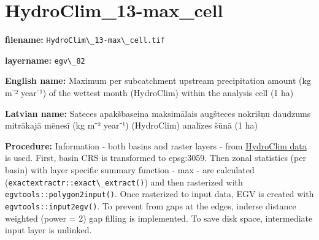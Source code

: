 \documentclass[
]{book}
\newcommand{\passthrough}[1]{#1}
\begin{document}
\section{HydroClim\_13-max\_cell}\label{ch06.082}

\textbf{filename:} \passthrough{\lstinline!HydroClim\_13-max\_cell.tif!}

\textbf{layername:} \passthrough{\lstinline!egv\_82!}

\textbf{English name:} Maximum per subcatchment upstream precipitation amount (kg m⁻² year⁻¹) of the wettest month (HydroClim) within the analysis cell (1 ha)

\textbf{Latvian name:} Sateces apakšbaseina maksimālais augšteces nokrišņu daudzums mitrākajā mēnesī (kg m⁻² year⁻¹) (HydroClim) analīzes šūnā (1 ha)

\textbf{Procedure:} Information - both basins and raster layers - from \hyperref[Ch04.12]{HydroClim data}
is used. First, basin CRS is transformed to epsg:3059. Then zonal statistics (per basin) with
layer specific summary function - max - are calculated (\passthrough{\lstinline!exactextractr::exact\_extract()!})
and then rasterized with \passthrough{\lstinline!egvtools::polygon2input()!}. Once rasterized to input data,
EGV is created with \passthrough{\lstinline!egvtools::input2egv()!}. To prevent from gaps at the edges,
inderse distance weighted (power = 2) gap filling is implemented. To save disk space,
intermediate input layer is unlinked.
\end{document}
